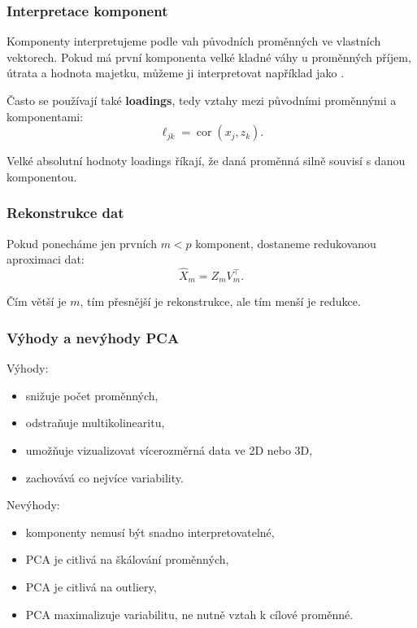 \subsubsection{Interpretace komponent}

Komponenty interpretujeme podle vah původních proměnných ve vlastních vektorech.
Pokud má první komponenta velké kladné váhy u proměnných příjem, útrata a hodnota majetku,
můžeme ji interpretovat například jako .

Často se používají také \textbf{loadings}, tedy vztahy mezi původními proměnnými a komponentami:
\[
\ell_{jk}
=
\operatorname{cor}(x_j,z_k).
\]

Velké absolutní hodnoty loadings říkají, že daná proměnná silně souvisí s danou komponentou.

\subsubsection{Rekonstrukce dat}

Pokud ponecháme jen prvních $m<p$ komponent, dostaneme redukovanou aproximaci dat:
\[
\hat X_m = Z_m V_m^\top.
\]

Čím větší je $m$, tím přesnější je rekonstrukce, ale tím menší je redukce.

\subsubsection{Výhody a nevýhody PCA}

Výhody:
\begin{itemize}
    \item snižuje počet proměnných,
    \item odstraňuje multikolinearitu,
    \item umožňuje vizualizovat vícerozměrná data ve 2D nebo 3D,
    \item zachovává co nejvíce variability.
\end{itemize}

Nevýhody:
\begin{itemize}
    \item komponenty nemusí být snadno interpretovatelné,
    \item PCA je citlivá na škálování proměnných,
    \item PCA je citlivá na outliery,
    \item PCA maximalizuje variabilitu, ne nutně vztah k cílové proměnné.
\end{itemize}

